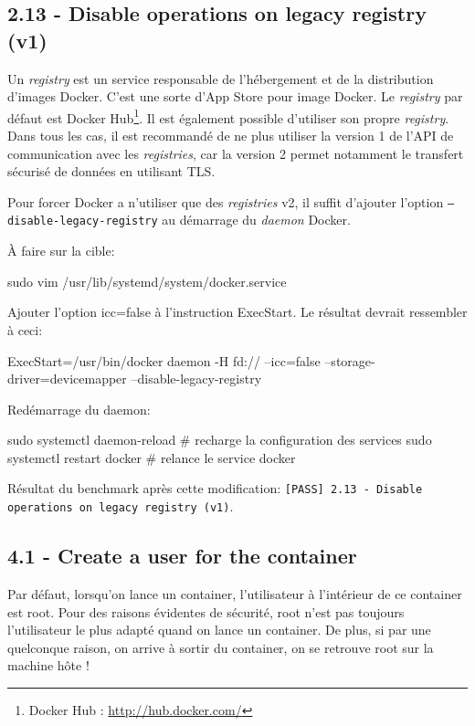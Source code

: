 \documentclass[11pt,a4paper,oneside]{report}
\newcommand{\code}[1]{\texttt{#1}}
\begin{document}
\subsection{2.13 - Disable operations on legacy registry (v1)}
Un \textit{registry} est un service responsable de l'hébergement et de la distribution d'images Docker. C'est une sorte d'App Store pour image Docker. Le \textit{registry} par défaut est Docker Hub\footnote{Docker Hub : \url{http://hub.docker.com/}}. Il est également possible d'utiliser son propre \textit{registry}. Dans tous les cas, il est recommandé de ne plus utiliser la version 1 de l'API de communication avec les \textit{registries}, car la version 2 permet notamment le transfert sécurisé de données en utilisant TLS\cite{blog_docker_registry_v2}.

Pour forcer Docker a n'utiliser que des \textit{registries} v2, il suffit d'ajouter l'option \code{--disable-legacy-registry} au démarrage du \textit{daemon} Docker.

À faire sur la cible:

\begin{bashcode}
sudo vim /usr/lib/systemd/system/docker.service
\end{bashcode}

Ajouter l'option icc=false à l'instruction ExecStart. Le résultat devrait ressembler à ceci:

\begin{bashcode}
ExecStart=/usr/bin/docker daemon -H fd:// --icc=false --storage-driver=devicemapper --disable-legacy-registry
\end{bashcode}

Redémarrage du daemon:

\begin{bashcode}
sudo systemctl daemon-reload # recharge la configuration des services
sudo systemctl restart docker # relance le service docker
\end{bashcode}

Résultat du benchmark après cette modification: \code{[PASS] 2.13 - Disable operations on legacy registry (v1)}.


\subsection{4.1  - Create a user for the container}
Par défaut, lorsqu'on lance un container, l'utilisateur à l'intérieur de ce container est root. Pour des raisons évidentes de sécurité, root n'est pas toujours l'utilisateur le plus adapté quand on lance un container. De plus, si par une quelconque raison, on arrive à sortir du container, on se retrouve root sur la machine hôte !
\end{document}
